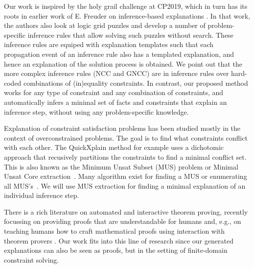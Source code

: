 Our work is inspired by the holy grail challenge at CP2019, which in turn has its roots in earlier work of E. Freuder on inference-based explanations \cite{sqalli1996inference}. In that work, the authors also look at logic grid puzzles and develop a number of problem-specific inference rules that allow solving such puzzles without search. These inference rules are equiped with explanation templates such that each propagation event of an inference rule also has a templated explanation, and hence an explanation of the solution process is obtained. We point out that the more complex inference rules (NCC and GNCC) are in inference rules over hard-coded combinations of (in)equality constraints. In contrast, our proposed method works for any type of constraint and any combination of constraints, and automatically infers a minimal set of facts and constraints that explain an inference step, without using any problem-specific knowledge.

Explanation of constraint satisfaction problems has been studied mostly in the context of overconstrained problems. The goal is to find what constraints conflict with each other. The QuickXplain method \cite{junker2001quickxplain} for example uses a dichotomic approach that recusively partitions the constraints to find a minimal conflict set. This is also known as the Minimum Unsat Subset (MUS) problem or Minimal Unsat Core extraction~\cite{marques2010minimal}. Many algorithm exist for finding a MUS or enumerating all MUS's~\cite{marques2010minimal}. We will use MUS extraction for finding a minimal explanation of an individual inference step.

There is a rich literature on automated and interactive theorem proving, recently focussing on providing proofs that are understandable for humans \cite{Ganesalingam2017} and, e.g.,  on teaching humans how to craft mathematical proofs using interaction with theorem provers \cite{DBLP:conf/icml/YangD19}. 
Our work fits into this line of research since our generated explanations can also be seen as proofs, but in the setting of finite-domain constraint solving.




